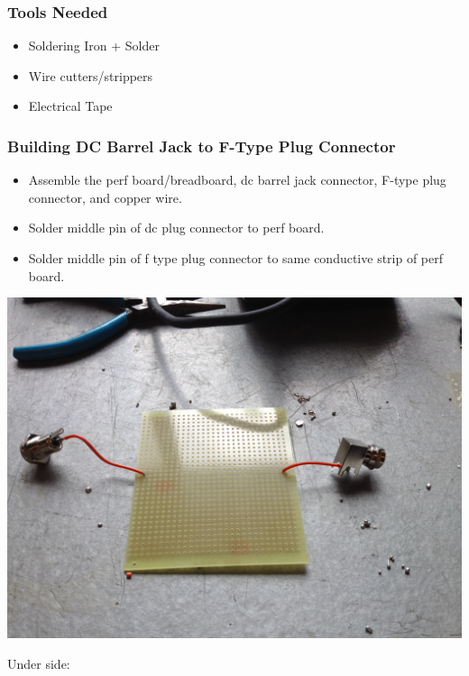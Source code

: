 \documentclass[11pt]{article} %
\begin{document}
\subsubsection{Tools Needed}

\begin{itemize}
\item Soldering Iron + Solder
\item Wire cutters/strippers
\item Electrical Tape
\end{itemize}

\subsubsection{Building DC Barrel Jack to F-Type Plug Connector}

\begin{itemize}
\item Assemble the perf board/breadboard, dc barrel jack connector, F-type plug connector, and copper wire.
\item Solder middle pin of dc plug connector to perf board.
\item Solder middle pin of f type plug connector to same conductive strip of perf board. 
\end{itemize}

\begin{center}
\includegraphics[scale=0.20]{lnainterface/02.jpeg}
\end{center}

Under side:
\end{document}
